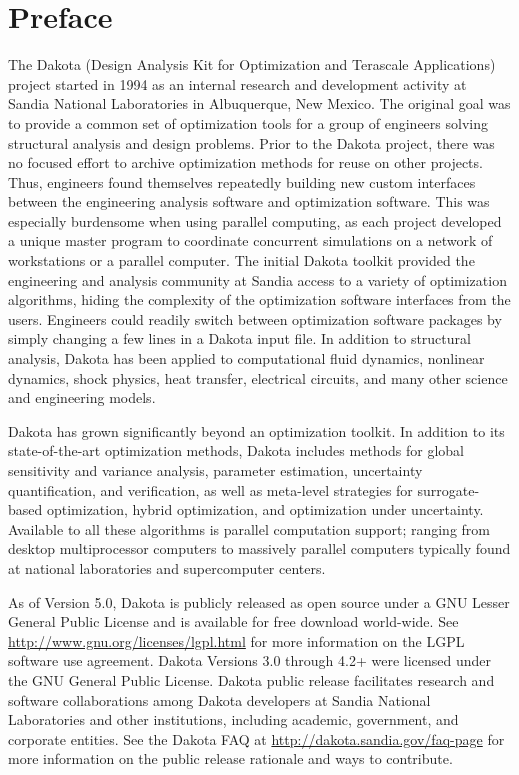 \chapter*{Preface}

The Dakota (Design Analysis Kit for Optimization and Terascale
Applications) project started in 1994 as an internal research and
development activity at Sandia National Laboratories in Albuquerque,
New Mexico. The original goal was to provide a common set of
optimization tools for a group of engineers solving structural
analysis and design problems. Prior to the Dakota project, there was
no focused effort to archive optimization methods for reuse on other
projects. Thus, engineers found themselves repeatedly building new
custom interfaces between the engineering analysis software and
optimization software. This was especially burdensome when using
parallel computing, as each project developed a unique master program
to coordinate concurrent simulations on a network of workstations or a
parallel computer. The initial Dakota toolkit provided the engineering
and analysis community at Sandia access to a variety of optimization
algorithms, hiding the complexity of the optimization software
interfaces from the users. Engineers could readily switch between
optimization software packages by simply changing a few lines in a
Dakota input file. In addition to structural analysis, Dakota has been
applied to computational fluid dynamics, nonlinear dynamics, shock
physics, heat transfer, electrical circuits, and many other science
and engineering models.

Dakota has grown significantly beyond an optimization toolkit.  In
addition to its state-of-the-art optimization methods, Dakota includes
methods for global sensitivity and variance analysis, parameter
estimation, uncertainty quantification, and verification, as well as
meta-level strategies for surrogate-based optimization, hybrid
optimization, and optimization under uncertainty. Available to all
these algorithms is parallel computation support; ranging from desktop
multiprocessor computers to massively parallel computers typically
found at national laboratories and supercomputer centers.

As of Version 5.0, Dakota is publicly released as open source under a
GNU Lesser General Public License and is available for free download
world-wide.  See \url{http://www.gnu.org/licenses/lgpl.html} for more
information on the LGPL software use agreement.  Dakota Versions 3.0
through 4.2+ were licensed under the GNU General Public License.
Dakota public release facilitates research and software collaborations
among Dakota developers at Sandia National Laboratories and other
institutions, including academic, government, and corporate
entities. See the Dakota FAQ at
\url{http://dakota.sandia.gov/faq-page} for more information on the
public release rationale and ways to contribute.

